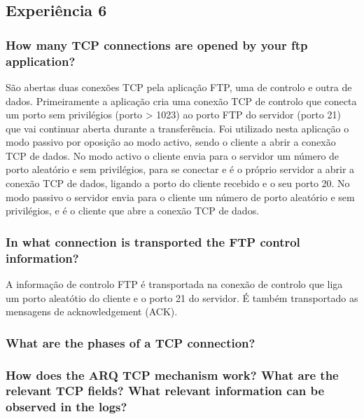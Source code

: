 \documentclass[a4paper]{article}
\begin{document}
\subsection{Experiência 6}

\subsubsection{How many TCP connections are opened by your ftp application?}

São abertas duas conexões TCP pela aplicação FTP, uma de controlo e outra de dados.
Primeiramente a aplicação cria uma conexão TCP de controlo que conecta um porto sem privilégios (porto > 1023) ao porto FTP do servidor (porto 21) que vai continuar aberta durante a transferência.
Foi utilizado nesta aplicação o modo passivo por oposição ao modo activo, sendo o cliente a abrir a conexão TCP de dados.
No modo activo o cliente envia para o servidor um número de porto aleatório e sem privilégios, para se conectar e é o próprio servidor a abrir a conexão TCP de dados, ligando a porto do cliente recebido e o seu porto 20.
No modo passivo o servidor envia para o cliente um número de porto aleatório e sem privilégios, e é o cliente que abre a conexão TCP de dados.

\subsubsection{In what connection is transported the FTP control information?}

A informação de controlo FTP é transportada na conexão de controlo que liga um porto aleatótio do cliente e o porto 21 do servidor. É também transportado as mensagens de acknowledgement (ACK).

\subsubsection{What are the phases of a TCP connection?}

\subsubsection{How does the ARQ TCP mechanism work? What are the relevant TCP
fields? What relevant information can be observed in the logs?}
\end{document}
